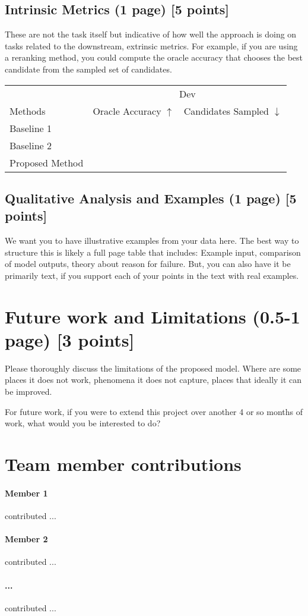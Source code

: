 \documentclass[11pt,a4paper]{article}
\begin{document}
\subsection{Intrinsic Metrics (1 page) [5 points]}
These are not the task itself but indicative of how well the approach is doing on tasks related to the downstream, extrinsic metrics. For example, if you are using a reranking method, you could compute the oracle accuracy that chooses the best candidate from the sampled set of candidates.
\begin{table}[t]
\centering
\begin{tabular}{@{}lrr@{}}
\toprule
                            & \multicolumn{2}{c}{Dev} \\
Methods                     & Oracle Accuracy $\uparrow$ & Candidates Sampled $\downarrow$  \\
\midrule
Baseline 1 \cite{} & & \\
Baseline 2 \cite{} & & \\
\midrule
Proposed Method             & &  \\
\bottomrule
\end{tabular}
\end{table}

\clearpage
\subsection{Qualitative Analysis and Examples (1 page) [5 points]}
We want you to have illustrative examples from your data here. The best way to structure this is likely a full page table that includes: Example input, comparison of model outputs, theory about reason for failure. But, you can also have it be primarily text, if you support each of your points in the text with real examples.

\clearpage
\section{Future work and Limitations (0.5-1 page) [3 points]}
Please thoroughly discuss the limitations of the proposed model.  Where are some places it does not work, phenomena it does not capture, places that ideally it can be improved.

For future work, if you were to extend this project over another 4 or so months of work, what would you be interested to do?

\clearpage
\section{Team member contributions}
\paragraph{Member 1} contributed ...

\paragraph{Member 2} contributed ...

\paragraph{...} contributed ...





\end{document}
